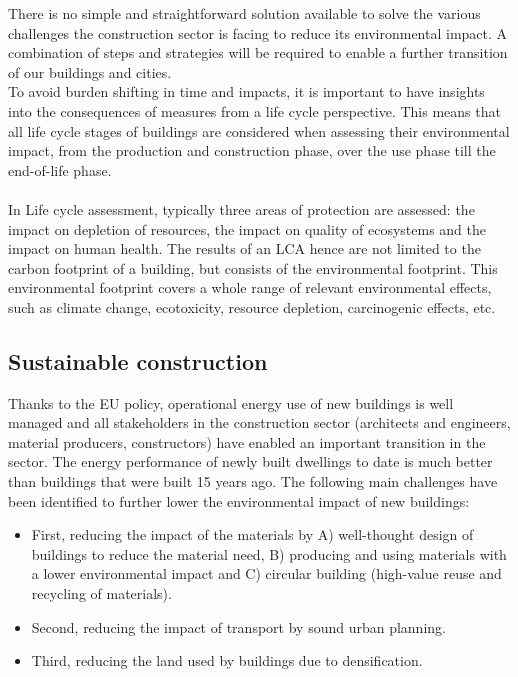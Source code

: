 \documentclass[../summary.tex]{subfiles}
\begin{document}
	There is no simple and straightforward solution available to solve the various challenges the construction sector is facing to reduce its environmental impact. A combination of steps and strategies will be required to enable a further transition of our buildings and cities.
	\\
	To avoid burden shifting in time and impacts, it is important to have insights into the consequences of measures from a life cycle perspective. This means that all life cycle stages of buildings are considered when assessing their environmental impact, from the production and construction phase, over the use phase till the end-of-life phase. 
	\\\\
	In Life cycle assessment, typically three areas of protection are assessed: the impact on depletion of resources, the impact on quality of ecosystems and the impact on human health. The results of an LCA hence are not limited to the carbon footprint of a building, but consists of the environmental footprint. This environmental footprint covers a whole range of relevant environmental effects, such as climate change, ecotoxicity, resource depletion, carcinogenic effects, etc.
	
	\subsection{Sustainable construction}
	
	Thanks to the EU policy, operational energy use of new buildings is well managed and all stakeholders in the construction sector (architects and engineers, material producers, constructors) have enabled an important transition in the sector. The energy performance of newly built dwellings to date is much better than buildings that were built 15 years ago. The following main challenges have been identified to further lower the environmental impact of new buildings:
	\begin{itemize}
	\item First, reducing the impact of the materials by A) well-thought design of buildings to reduce the material need, B) producing and using materials with a lower environmental impact and C) circular building (high-value reuse and recycling of materials).
	\item Second, reducing the impact of transport by sound urban planning.
	\item Third, reducing the land used by buildings due to densification.
	\end{itemize}
	
\end{document}
